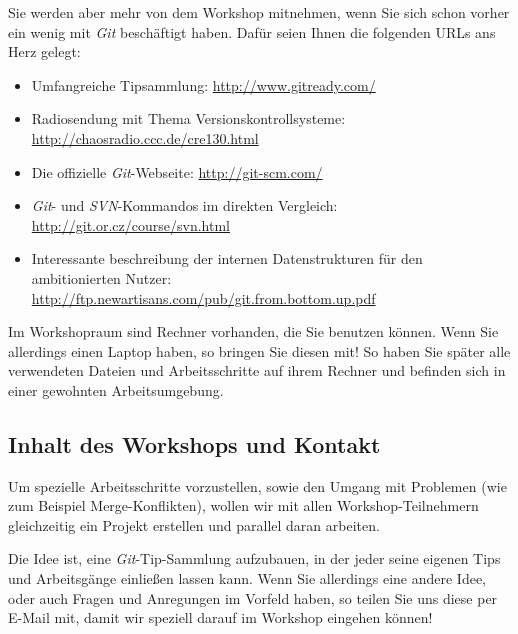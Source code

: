 \documentclass[11pt,            %
               a4paper,         %
               oneside,         %
               DIV12,           %
               fleqn,           %
               smallheadings,   %
               halfparskip,     %
               nochapterprefix, %
               bibtotocnumbered,%
              ]{scrartcl} %
\begin{document}
Sie werden aber mehr von dem Workshop mitnehmen, wenn Sie sich schon
vorher ein wenig mit \emph{Git} beschäftigt haben. Dafür seien Ihnen
die folgenden URLs ans Herz gelegt:

\begin{itemize}
\item Umfangreiche Tipsammlung:
  \url{http://www.gitready.com/}
\item Radiosendung mit Thema Versionskontrollsysteme:\\
  \url{http://chaosradio.ccc.de/cre130.html}
\item Die offizielle \emph{Git}-Webseite:
  \url{http://git-scm.com/}
\item \emph{Git}- und \emph{SVN}-Kommandos im direkten Vergleich:\\
  \url{http://git.or.cz/course/svn.html}
\item Interessante beschreibung der internen Datenstrukturen für den ambitionierten Nutzer:\\
    \url{http://ftp.newartisans.com/pub/git.from.bottom.up.pdf}
\end{itemize}

Im Workshopraum sind Rechner vorhanden, die Sie benutzen können. Wenn
Sie allerdings einen Laptop haben, so bringen Sie diesen mit! So haben
Sie später alle verwendeten Dateien und Arbeitsschritte auf ihrem
Rechner und befinden sich in einer gewohnten Arbeitsumgebung.




\subsection*{Inhalt des Workshops und Kontakt}

Um spezielle Arbeitsschritte vorzustellen, sowie den Umgang mit
Problemen (wie zum Beispiel Merge-Konflikten), wollen wir mit allen
Workshop-Teilnehmern gleichzeitig ein Projekt erstellen und parallel
daran arbeiten.

Die Idee ist, eine \emph{Git}-Tip-Sammlung aufzubauen, in der jeder
seine eigenen Tips und Arbeitsgänge einließen lassen kann.
Wenn Sie allerdings eine andere Idee, oder auch Fragen und Anregungen
im Vorfeld haben, so teilen Sie uns diese per E-Mail mit, damit wir
speziell darauf im Workshop eingehen können!
\end{document}
